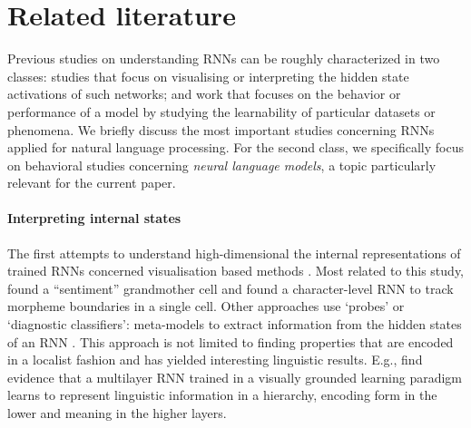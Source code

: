 
\section{Related literature}


Previous studies on understanding RNNs can be roughly characterized in two classes: studies that focus on visualising or interpreting the hidden state activations of such networks; and work that focuses on the behavior or performance of a model by studying the learnability of particular datasets or phenomena.
We briefly discuss the most important studies concerning RNNs applied for natural language processing.
For the second class, we specifically focus on behavioral studies concerning \textit{neural language models}, a topic particularly relevant for the current paper.

\paragraph{Interpreting internal states}
The first attempts to understand high-dimensional the internal representations of trained RNNs concerned visualisation based methods \cite{Karpathy:etal:2016,tang2017memory,li2016visualizing,Radford:etal:2017}.
Most related to this study,  found a ``sentiment'' grandmother cell and  found a character-level RNN to track morpheme boundaries in a single cell.
Other approaches use `probes' or `diagnostic classifiers': meta-models to extract information from the hidden states of an RNN \cite{Adi:etal:2017,Hupkes:etal:2017,alain2017understanding}.
This approach is not limited to finding properties that are encoded in a localist fashion and has yielded interesting linguistic results.
E.g.,  find evidence that a multilayer RNN trained in a visually grounded learning paradigm learns to represent linguistic information in a hierarchy, encoding form in the lower and meaning in the higher layers.

